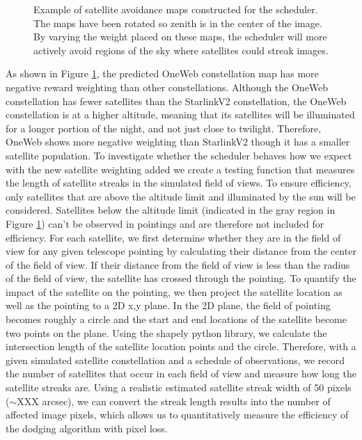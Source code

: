 \documentclass[linenumbers]{aastex631}
\begin{document}
\begin{figure}[ht!]
\caption{Example of satellite avoidance maps constructed for the scheduler. The maps have been rotated so zenith is in the center of the image. By varying the weight placed on these maps, the scheduler will more actively avoid regions of the sky where satellites could streak images. \label{fig-simulated-scheduler}}
\end{figure}

As shown in Figure \ref{fig-simulated-scheduler}, the predicted OneWeb constellation map has more negative reward weighting than other constellations. Although the OneWeb constellation has fewer satellites than the StarlinkV2 constellation, the OneWeb constellation is at a higher altitude, meaning that its satellites will be illuminated for a longer portion of the night, and not just close to twilight. Therefore, OneWeb shows more negative weighting than StarlinkV2 though it has a smaller satellite population. To investigate whether the scheduler behaves how we expect with the new satellite weighting added we create a testing function that measures the length of satellite streaks in the simulated field of views. To ensure efficiency, only satellites that are above the altitude limit and illuminated by the sun will be considered. Satellites below the altitude limit (indicated in the gray region in Figure \ref{fig-simulated-scheduler}) can’t be observed in pointings and are therefore not included for efficiency. For each satellite, we first determine whether they are in the field of view for any given telescope pointing by calculating their distance from the center of the field of view. If their distance from the field of view is less than the radius of the field of view, the satellite has crossed through the pointing. To quantify the impact of the satellite on the pointing, we then project the satellite location as well as the pointing to a 2D x,y plane. In the 2D plane, the field of pointing becomes roughly a circle and the start and end locations of the satellite become two points on the plane. Using the shapely python library, we calculate the intersection length of the satellite location points and the circle. Therefore, with a given simulated satellite constellation and a schedule of observations, we record the number of satellites that occur in each field of view and measure how long the satellite streaks are. Using a realistic estimated satellite streak width of 50 pixels ($\sim$XXX arcsec), we can convert the streak length results into the number of affected image pixels, which allows us to quantitatively measure the efficiency of the dodging algorithm with pixel loss. 
\end{document}
